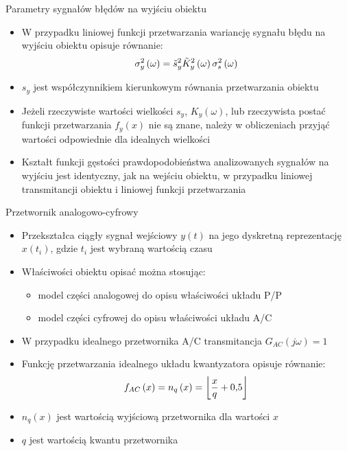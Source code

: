 \documentclass[12pt, polish, aspectratio = 169]{beamer}
\begin{document}
\begin{frame}{Parametry sygnałów błędów na wyjściu obiektu}
\begin{itemize}
\item W przypadku liniowej funkcji przetwarzania wariancję sygnału błędu na wyjściu obiektu opisuje równanie:
\begin{equation}
\sigma_{y}^{2} \left(\omega\right) = \tilde{s}_{y}^{2} \tilde{K}_{y}^{2} \left(\omega\right) \sigma_{s}^{2} \left(\omega\right) \label{eq:out_cont_var_omega}
\end{equation}
\item $s_{y}$ jest współczynnikiem kierunkowym równania przetwarzania obiektu
\item Jeżeli rzeczywiste wartości wielkości $s_{y}$, $K_{y}(\omega)$, lub rzeczywista postać funkcji przetwarzania $f_{y}(x)$ nie są znane, należy w obliczeniach przyjąć wartości odpowiednie dla idealnych wielkości
\item Kształt funkcji gęstości prawdopodobieństwa analizowanych sygnałów na wyjściu jest identyczny, jak na wejściu obiektu, w przypadku liniowej transmitancji obiektu i liniowej funkcji przetwarzania
\end{itemize}
\end{frame}

\begin{frame}{Przetwornik analogowo-cyfrowy}
\begin{itemize}
\item Przekształca ciągły sygnał wejściowy $y(t)$ na jego dyskretną reprezentację $x(t_{i})$, gdzie $t_{i}$ jest wybraną wartością czasu
\item Właściwości obiektu opisać można stosując:
	\begin{itemize}
	\item model części analogowej do opisu właściwości układu P/P
	\item model części cyfrowej do opisu właściwości układu A/C
	\end{itemize}
\item W przypadku idealnego przetwornika A/C transmitancja $G_{AC}(j\omega) = 1$
\item Funkcję przetwarzania idealnego układu kwantyzatora opisuje równanie:
\begin{equation}
f_{AC} \left(x\right) = n_{q} \left(x\right) = \left\lfloor \frac{x}{q} + \num{0.5} \right\rfloor \label{eq:adc_function}
\end{equation}
\item $n_{q}(x)$ jest wartością wyjściową przetwornika dla wartości $x$
\item $q$ jest wartością kwantu przetwornika
\end{itemize}
\end{frame}
\end{document}
